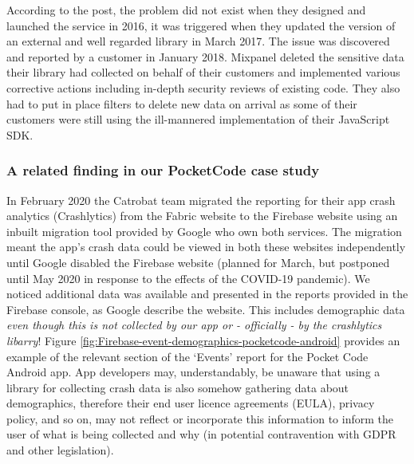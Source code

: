 According to the post, the problem did not exist when they designed and launched the service in 2016, it was triggered when they updated the version of an external and well regarded library in March 2017. The issue was discovered and reported by a customer in January 2018. Mixpanel deleted the sensitive data their library had collected on behalf of their customers and implemented various corrective actions including in-depth security reviews of existing code. They also had to put in place filters to delete new data on arrival as some of their customers were still using the ill-mannered implementation of their JavaScript SDK. %

\subsubsection{A related finding in our PocketCode case study}
In February 2020 the Catrobat team migrated the reporting for their app crash analytics (Crashlytics) from the Fabric website to the Firebase website using an inbuilt migration tool provided by Google who own both services. The migration meant the app's crash data could be viewed in both these websites independently until Google disabled the Firebase website (planned for March, but postponed until  May 2020 in response to the effects of the COVID-19 pandemic).  We noticed additional data was available and presented in the reports provided in the Firebase console, as Google describe the website. This includes demographic data \emph{even though this is not collected by our app or - officially - by the crashlytics libarry}! Figure \ref{fig:Firebase-event-demographics-pocketcode-android} provides an example of the relevant section of the `Events' report for the Pocket Code Android app. App developers may, understandably, be unaware that using a library for collecting crash data is also somehow gathering data about demographics, therefore their end user licence agreements (EULA), privacy policy, and so on, may not reflect or incorporate this information to inform the user of what is being collected and why (in potential contravention with GDPR and other legislation).

